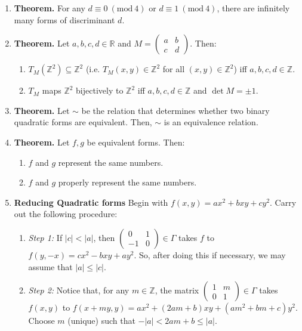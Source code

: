 \documentclass[11pt]{article}
\theoremstyle{definition}
\theoremstyle{named}
\newcommand{\Mod}[1]{\ (\mathrm{mod}\ #1)}
\begin{document}
\begin{enumerate}
    \item \textbf{Theorem. } For any $d \equiv 0 \Mod{4}$ or $d \equiv 1 \Mod{4}$, there are infinitely many forms of discriminant $d$. 
    \item \textbf{Theorem. } Let $a,b,c,d \in \mathbb{R}$ and $M=\begin{pmatrix}
        a & b\\
        c & d
    \end{pmatrix}$. Then: 
    \begin{enumerate}
        \item $T_M(\mathbb{Z}^2) \subseteq \mathbb{Z}^2$ (i.e. $T_M(x,y) \in \mathbb{Z}^2$ for all $(x,y) \in \mathbb{Z}^2$) iff $a,b,c,d \in \mathbb{Z}$. 
        \item $T_M$ maps $\mathbb{Z}^2$ bijectively to $\mathbb{Z}^2$ iff $a,b,c,d \in \mathbb{Z}$ and $\det M = \pm 1$. 
    \end{enumerate}
    \item \textbf{Theorem. } Let $\sim$ be the relation that determines whether two binary quadratic forms are equivalent. Then, $\sim$ is an equivalence relation. 
    \item \textbf{Theorem. } Let $f,g$ be equivalent forms. Then: 
    \begin{enumerate}
        \item $f$ and $g$ represent the same numbers. 
        \item $f$ and $g$ properly represent the same numbers. 
    \end{enumerate}
    \item \textbf{Reducing Quadratic forms} Begin with $f(x,y) = ax^2 + bxy + cy^2$. Carry out the following procedure: 
    \begin{enumerate}
        \item \textit{Step 1: } If $|c| < |a|$, then $\begin{pmatrix}
            0 & 1 \\
            -1 & 0
        \end{pmatrix} \in \Gamma$ takes $f$ to $f(y,-x) = cx^2 - bxy + ay^2$. So, after doing this if necessary, we may assume that $|a| \leq |c|$. 
        \item \textit{Step 2: } Notice that, for any $m \in \mathbb{Z}$, the matrix $\begin{pmatrix}
            1 & m \\
            0 & 1
        \end{pmatrix} \in \Gamma$ takes $f(x,y)$ to $f(x+my,y) = ax^2 + (2am+b)xy + (am^2 + bm + c)y^2$. Choose $m$ (unique) such that $-|a| < 2am + b \leq |a|$. 

\end{enumerate}
\end{enumerate}
\end{document}

